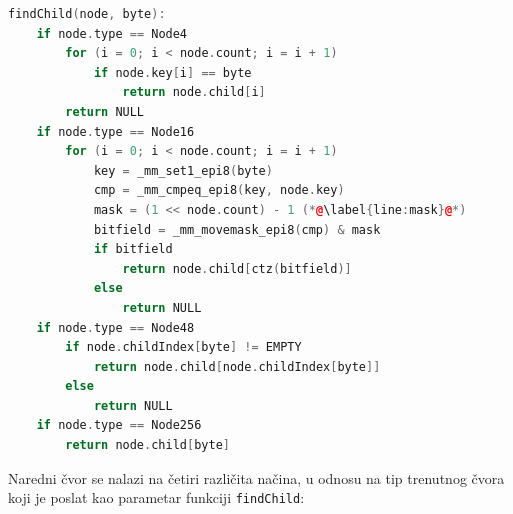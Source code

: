 \documentclass[12pt,oneside]{memoir}
\begin{document}
\begin{lstlisting}[language=C++,
                   caption={Algoritam pronalaska idućeg čvora pretrage},
                   label={kod:algoritam_findChild}]
findChild(node, byte):
    if node.type == Node4
        for (i = 0; i < node.count; i = i + 1)
            if node.key[i] == byte
                return node.child[i]
        return NULL
    if node.type == Node16
        for (i = 0; i < node.count; i = i + 1)
            key = _mm_set1_epi8(byte)
            cmp = _mm_cmpeq_epi8(key, node.key)
            mask = (1 << node.count) - 1 (*@\label{line:mask}@*)
            bitfield = _mm_movemask_epi8(cmp) & mask
            if bitfield
                return node.child[ctz(bitfield)]
            else
                return NULL
    if node.type == Node48
        if node.childIndex[byte] != EMPTY
            return node.child[node.childIndex[byte]]
        else
            return NULL
    if node.type == Node256
        return node.child[byte]
\end{lstlisting}

Naredni čvor se nalazi na četiri različita načina, u odnosu na
tip trenutnog čvora koji je poslat kao parametar funkciji
\texttt{findChild}:
\end{document}
